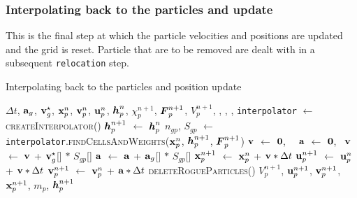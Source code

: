 \subsubsection{Interpolating back to the particles and update}
This is the final step at which the particle velocities and positions are updated and the grid
is reset.  Particle that are to be removed are dealt with in a subsequent \texttt{relocation} step.
\begin{breakablealgorithm}
  \caption{Interpolating back to the particles and position update}
  \begin{algorithmic}[1]
    \Require $\Delta t$, 
             $\mathbf{a}_g$, $\mathbf{v}_g^\star$, $\mathbf{x}_p^n$, $\mathbf{v}_p^n$, $\mathbf{u}_p^n$, $\boldsymbol{h}_p^n$, $\chi_p^{n+1}$, $\boldsymbol{F}_p^{n+1}$,
             $V_p^{n+1}$,
             , , , 
      \State \texttt{interpolator} $\leftarrow$ \textsc{createInterpolator}()
        \State $\boldsymbol{h}_p^{n+1}$ $\leftarrow$ $\boldsymbol{h}_p^n$
          \State $n_{gp}$, $S_{gp}$ $\leftarrow$ 
            \texttt{interpolator}.\textsc{findCellsAndWeights}($\mathbf{x}_p^n$, $\boldsymbol{h}_p^{n+1}$, $\boldsymbol{F}_p^{n+1}$)
          \State $\mathbf{v}$ $\leftarrow$ $\boldsymbol{0}$,~~ $\mathbf{a}$ $\leftarrow$ $\boldsymbol{0}$,~
            \State $\mathbf{v}$ $\leftarrow$ $\mathbf{v}$ + $\mathbf{v}_g^\star$[\TTnode] $*$ $S_{gp}$[\TTnode]
            \State $\mathbf{a}$ $\leftarrow$ $\mathbf{a}$ + $\mathbf{a}_g$[\TTnode] $*$ $S_{gp}$[\TTnode]
          \EndFor
          \State $\mathbf{x}_p^{n+1}$ $\leftarrow$ $\mathbf{x}_p^n$ + $\mathbf{v} * \Delta t$
          \State $\mathbf{u}_p^{n+1}$ $\leftarrow$ $\mathbf{u}_p^n$ + $\mathbf{v} * \Delta t$
          \State $\mathbf{v}_p^{n+1}$ $\leftarrow$ $\mathbf{v}_p^n$ + $\mathbf{a} * \Delta t$
        \EndFor
      \EndFor
      \State \textsc{deleteRogueParticles}()
      \State \Return $V_p^{n+1}$, $\mathbf{u}_p^{n+1}$, $\mathbf{v}_p^{n+1}$, $\mathbf{x}_p^{n+1}$, $m_p$, $\boldsymbol{h}_p^{n+1}$
    \EndProcedure
  \end{algorithmic}
\end{breakablealgorithm}

